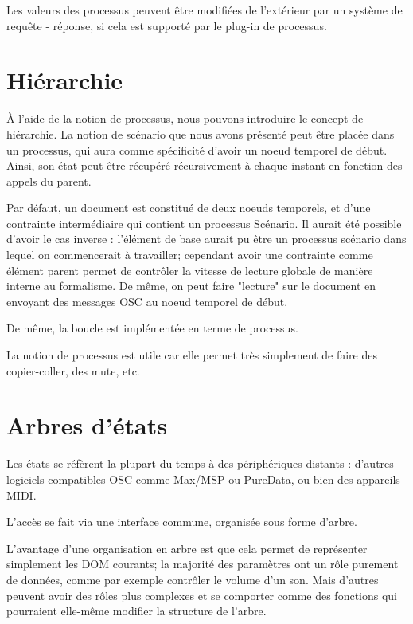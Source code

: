\documentclass{sigchi}
\begin{document}
Les valeurs des processus peuvent être modifiées de l'extérieur par un système de requête - réponse, si cela est supporté par le plug-in de processus.



\section{Hiérarchie}
À l'aide de la notion de processus, nous pouvons introduire le concept de hiérarchie. La notion de scénario que nous avons présenté peut être placée dans un processus, qui aura comme spécificité d'avoir un noeud temporel de début. Ainsi, son état peut être récupéré récursivement à chaque instant en fonction des appels du parent.

Par défaut, un document est constitué de deux noeuds temporels, et d'une contrainte intermédiaire qui contient un processus Scénario.
Il aurait été possible d'avoir le cas inverse : l'élément de base aurait pu être un processus scénario dans lequel on commencerait à travailler; cependant avoir une contrainte comme élément parent permet de contrôler la vitesse de lecture globale de manière interne au formalisme. De même, on peut faire "lecture" sur le document en envoyant des messages OSC au noeud temporel de début.

De même, la boucle est implémentée en terme de processus.

La notion de processus est utile car elle permet très simplement de faire des copier-coller, des mute, etc.

\section{Arbres d'états}
Les états se réfèrent la plupart du temps à des périphériques distants : d'autres logiciels compatibles OSC comme Max/MSP ou PureData, ou bien des appareils MIDI.

L'accès se fait via une interface commune, organisée sous forme d'arbre.




L'avantage d'une organisation en arbre est que cela permet de représenter simplement les DOM courants; la majorité des paramètres ont un rôle purement de données, comme par exemple contrôler le volume d'un son. Mais d'autres peuvent avoir des rôles plus complexes et se comporter comme des fonctions qui pourraient elle-même modifier la structure de l'arbre.
\end{document}
